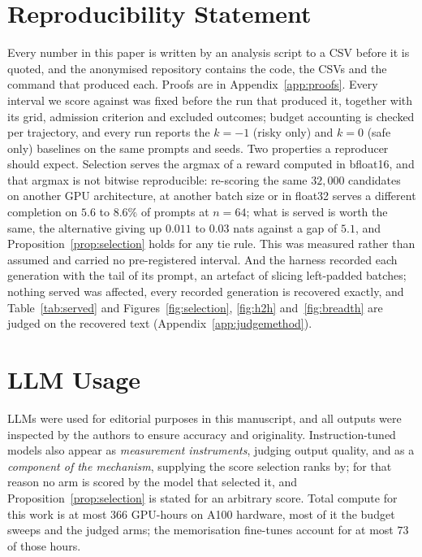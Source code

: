 \documentclass{article}
\begin{document}
\section*{Reproducibility Statement}
Every number in this paper is written by an analysis script to a CSV before it is quoted, and the
anonymised repository contains the code, the CSVs and the command that produced each. Proofs are in
Appendix~\ref{app:proofs}. Every interval we score against was fixed before the run that produced it,
together with its grid, admission criterion and excluded outcomes; budget accounting is checked per
trajectory, and every run reports the $k=-1$ (risky only) and $k=0$ (safe only) baselines on the same
prompts and seeds. Two properties a reproducer should expect. Selection serves the argmax of a reward
computed in bfloat16, and that argmax is not bitwise reproducible: re-scoring the same $32{,}000$
candidates on another GPU architecture, at another batch size or in float32 serves a different
completion on $5.6$ to $8.6\%$ of prompts at $n=64$; what is served is worth the same, the alternative giving up $0.011$ to $0.03$ nats against a gap of $5.1$, and Proposition~\ref{prop:selection} holds for any tie rule. This was measured rather than assumed and carried no pre-registered interval. And the harness recorded each generation with the tail of its prompt, an artefact of slicing
left-padded batches; nothing served was affected, every recorded generation is recovered exactly, and
Table~\ref{tab:served} and Figures~\ref{fig:selection}, \ref{fig:h2h} and~\ref{fig:breadth} are judged on
the recovered text (Appendix~\ref{app:judgemethod}).

\section*{LLM Usage}
LLMs were used for editorial purposes in this manuscript, and all outputs were inspected by the
authors to ensure accuracy and originality. Instruction-tuned models also appear as \emph{measurement
instruments}, judging output quality, and as a \emph{component of the mechanism}, supplying the score
selection ranks by; for that reason no arm is scored by the model that selected it, and
Proposition~\ref{prop:selection} is stated for an arbitrary score. Total compute for this work is at most
$366$ GPU-hours on A100 hardware, most of it the budget sweeps and the judged arms; the memorisation
fine-tunes account for at most $73$ of those hours.



\end{document}

